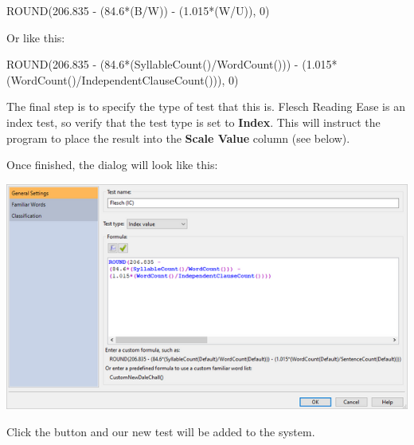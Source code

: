 \documentclass[
]{book}
\newenvironment{Shaded}{\begin{snugshade}}{\end{snugshade}}
\newcommand{\DecValTok}[1]{\textcolor[rgb]{0.00,0.00,0.81}{#1}}
\newcommand{\FloatTok}[1]{\textcolor[rgb]{0.00,0.00,0.81}{#1}}
\newcommand{\FunctionTok}[1]{\textcolor[rgb]{0.00,0.00,0.00}{#1}}
\newcommand{\NormalTok}[1]{#1}
\newcommand{\SpecialCharTok}[1]{\textcolor[rgb]{0.00,0.00,0.00}{#1}}
\theoremstyle{definition}
\theoremstyle{definition}
\theoremstyle{definition}
\theoremstyle{definition}
\theoremstyle{remark}
\begin{document}
\begin{Shaded}
\begin{Highlighting}[]
\FunctionTok{ROUND}\NormalTok{(}\FloatTok{206.835} \SpecialCharTok{{-}}\NormalTok{ (}\FloatTok{84.6}\SpecialCharTok{*}\NormalTok{(B}\SpecialCharTok{/}\NormalTok{W)) }\SpecialCharTok{{-}}\NormalTok{ (}\FloatTok{1.015}\SpecialCharTok{*}\NormalTok{(W}\SpecialCharTok{/}\NormalTok{U)), }\DecValTok{0}\NormalTok{)}
\end{Highlighting}
\end{Shaded}

Or like this:

\begin{Shaded}
\begin{Highlighting}[]
\FunctionTok{ROUND}\NormalTok{(}\FloatTok{206.835} \SpecialCharTok{{-}}\NormalTok{ (}\FloatTok{84.6}\SpecialCharTok{*}\NormalTok{(}\FunctionTok{SyllableCount}\NormalTok{()}\SpecialCharTok{/}\FunctionTok{WordCount}\NormalTok{())) }\SpecialCharTok{{-}}  
\NormalTok{    (}\FloatTok{1.015}\SpecialCharTok{*}\NormalTok{(}\FunctionTok{WordCount}\NormalTok{()}\SpecialCharTok{/}\FunctionTok{IndependentClauseCount}\NormalTok{())), }\DecValTok{0}\NormalTok{)}
\end{Highlighting}
\end{Shaded}

The final step is to specify the type of test that this is. Flesch Reading Ease is an index test, so verify that the test type is set to \textbf{Index}. This will instruct the program to place the result into the \textbf{Scale Value} column (see below).

Once finished, the dialog will look like this:

\includegraphics{Images/CustomTestExample1Finished.png}

Click the  button and our new test will be added to the system.
\end{document}
